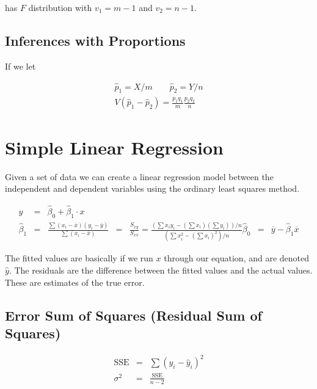    has $F$ distribution with $v_1 = m - 1$ and $v_2 = n - 1$.

    \subsection{Inferences with Proportions}
    If we let

    \begin{equation*}
        \begin{aligned}
            \hat{p}_1 = X/m \qquad \hat{p}_2 = Y/n\\
            V(\hat{p}_1 - \hat{p}_2) = \frac{p_1 q_1}{m} \frac{p_2 q_2}{n}
        \end{aligned}
    \end{equation*}

\section{Simple Linear Regression}
Given a set of data we can create a linear regression model between the independent and dependent variables using the
ordinary least squares method.

\begin{equation*}
    \begin{aligned}
        y &=& \hat{\beta}_0 + \hat{\beta}_1 \cdot x\\
        \hat{\beta}_1 &=& \frac{\sum \left( x_i - \overline{x} \right)\left( y_i - \overline{y} \right)}{\sum \left( x_i -
            \overline{x} \right)}
            &=& \frac{S_{xy} }{S_{xx} } = \frac{\left( \sum x_i y_i - \left( \sum x_i \right)\left( \sum y_i \right)
            \right)/n}{\left( \sum x^2_i - \left( \sum x_i \right)^2 \right) / n}
        \hat{\beta}_0 &=& \overline{y} - \hat{\beta}_1 \overline{x}
    \end{aligned}
\end{equation*}

The fitted values are basically if we run $x$ through our equation, and are denoted $\hat{y}$. The residuals are the
difference between the fitted values and the actual values. These are estimates of the true error.

    \subsection{Error Sum of Squares (Residual Sum of Squares)}
    \begin{equation*}
        \begin{aligned}
            \text{SSE} &=& \sum \left( y_i - \hat{y}_i \right)^2\\
            \sigma^2 &=& \frac{\text{SSE} }{n - 2}
        \end{aligned}
    \end{equation*}

